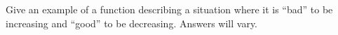 {Give an example of a function describing a situation where it is ``bad'' to be increasing and ``good'' to be decreasing.
}
{Answers will vary.
}
